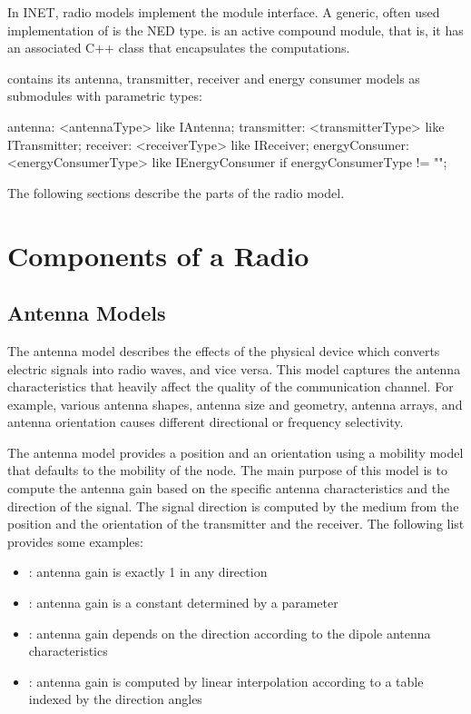 In INET, radio models implement the  module interface. 
A generic, often used implementation of  is the 
 NED type.  is an active compound module, 
that is, it has an associated C++ class that encapsulates the computations.

 contains its antenna, transmitter, receiver and energy
consumer models as submodules with parametric types:

\begin{ned}
antenna: <antennaType> like IAntenna;
transmitter: <transmitterType> like ITransmitter;
receiver: <receiverType> like IReceiver;
energyConsumer: <energyConsumerType> like IEnergyConsumer 
    if energyConsumerType != "";
\end{ned}

The following sections describe the parts of the radio model.

\section{Components of a Radio}

\subsection{Antenna Models}

The antenna model describes the effects of the physical device which converts
electric signals into radio waves, and vice versa. This model captures the
antenna characteristics that heavily affect the quality of the communication
channel. For example, various antenna shapes, antenna size and geometry, antenna
arrays, and antenna orientation causes different directional or frequency
selectivity.

The antenna model provides a position and an orientation using a mobility model
that defaults to the mobility of the node. The main purpose of this model is to
compute the antenna gain based on the specific antenna characteristics and the
direction of the signal. The signal direction is computed by the medium from the
position and the orientation of the transmitter and the receiver. The following
list provides some examples:

\begin{itemize}
  \item {}: antenna gain is exactly 1 in any direction
  \item {}: antenna gain is a constant determined by
    a parameter
  \item {}: antenna gain depends on the direction according
    to the dipole antenna characteristics
  \item {}: antenna gain is computed by linear
    interpolation according to a table indexed by the direction angles
\end{itemize}

